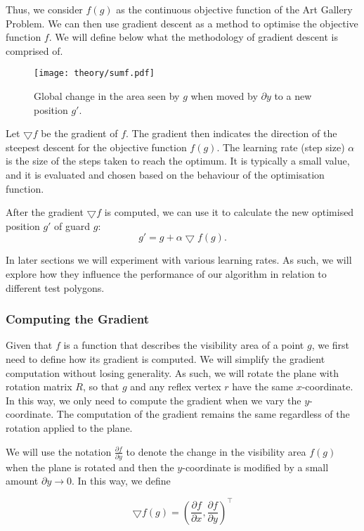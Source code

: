 Thus, we consider $f(g)$ as the continuous objective function of the Art Gallery Problem. We can then use gradient descent as a method to optimise the objective function $f$. We will define below what the methodology of gradient descent is comprised of.

\begin{figure}[h!]
    \centering
    \texttt{[image: theory/sumf.pdf]}
    \caption{Global change in the area seen by $g$ when moved by $\partial y$ to a new position $g'$.}
    \label{fig:sumf}
\end{figure}


Let $\bigtriangledown f$ be the gradient of $f$. The gradient then indicates the direction of the steepest descent for the objective function $f(g)$.
The learning rate (step size) $\alpha$ is the size of the steps taken to reach the optimum. It is typically a small value, and it is evaluated and chosen based on the behaviour of the optimisation function. 

After the gradient $\bigtriangledown f$ is computed, we can use it to calculate the new optimised position $g'$ of guard $g$: $$g' = g + \alpha\bigtriangledown f(g).$$


In later sections we will experiment with various learning rates. As such, we will explore how they influence the performance of our algorithm in relation to different test polygons. 

\subsubsection{Computing the Gradient}

Given that $f$ is a function that describes the visibility area of a point $g$, we first need to define how its gradient is computed. We will simplify the gradient computation without losing generality. As such, we will rotate the plane with rotation matrix $R$, so that $g$ and any reflex vertex $r$ have the same $x$-coordinate. In this way, we only need to compute the gradient when we vary the $y$-coordinate. The computation of the gradient remains the same regardless of the rotation applied to the plane.


We will use the notation $\frac{\partial f}{\partial y}$ to denote the change in the visibility area $f(g)$ when the plane is rotated and then the $y$-coordinate is modified by a small amount $\partial y \rightarrow 0$. In this way, we define 

\begin{equation}
    \bigtriangledown f(g) = \left(\frac{\partial f}{\partial x}, \frac{\partial f}{\partial y}\right)^\intercal \label{eq:gradient}
\end{equation}

